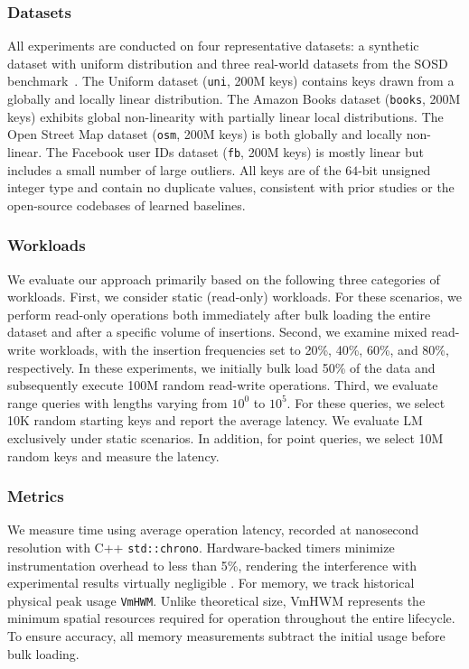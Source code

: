 \subsubsection{Datasets}
All experiments are conducted on four representative datasets: a synthetic dataset with uniform distribution and three real-world datasets from the SOSD benchmark~\cite{sosd20}. The Uniform dataset (\texttt{uni}, 200M keys) contains keys drawn from a globally and locally linear distribution. The Amazon Books dataset (\texttt{books}, 200M keys) exhibits global non-linearity with partially linear local distributions. The Open Street Map dataset (\texttt{osm}, 200M keys) is both globally and locally non-linear. The Facebook user IDs dataset (\texttt{fb}, 200M keys) is mostly linear but includes a small number of large outliers. All keys are of the $64$-bit unsigned integer type and contain no duplicate values, consistent with prior studies or the open-source codebases of learned baselines.

\subsubsection{Workloads}
We evaluate our approach primarily based on the following three categories of workloads. First, we consider static (read-only) workloads. For these scenarios, we perform read-only operations both immediately after bulk loading the entire dataset and after a specific volume of insertions. Second, we examine mixed read-write workloads, with the insertion frequencies set to 20\%, 40\%, 60\%, and 80\%, respectively. In these experiments, we initially bulk load 50\% of the data and subsequently execute 100M random read-write operations. Third, we evaluate range queries with lengths varying from $10^0$ to $10^5$. For these queries, we select 10K random starting keys and report the average latency. We evaluate LM exclusively under static scenarios. In addition, for point queries, we select 10M random keys and measure the latency.

\subsubsection{Metrics}
We measure time using average operation latency, recorded at nanosecond resolution with C++ \texttt{std::chrono}. Hardware-backed timers minimize instrumentation overhead to less than 5\%, rendering the interference with experimental results virtually negligible \cite{paoloni2010, najafi2021systems}. For memory, we track historical physical peak usage \texttt{VmHWM}. Unlike theoretical size, VmHWM represents the minimum spatial resources required for operation throughout the entire lifecycle. To ensure accuracy, all memory measurements subtract the initial usage before bulk loading.


